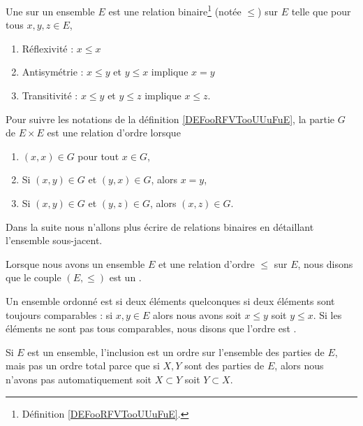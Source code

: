 \begin{definition}      \label{DefooFLYOooRaGYRk}
	Une  sur un ensemble \( E\) est une relation binaire\footnote{Définition \ref{DEFooRFVTooUUuFuE}.} (notée \( \leq\)) sur \( E\) telle que pour tous \( x,y,z\in E\),
	\begin{enumerate}
		\item
		      Réflexivité : \( x\leq x\)
		\item \label{ITEMooQTXOooTZXEnu}
		      Antisymétrie : \( x\leq y\) et \( y\leq x\) implique \( x=y\)
		\item
		      Transitivité : \( x\leq y\) et \( y\leq z\) implique \( x\leq z\).
	\end{enumerate}

	Pour suivre les notations de la définition \ref{DEFooRFVTooUUuFuE}, la partie \( G\) de \( E\times E\) est une relation d'ordre lorsque
	\begin{enumerate}
		\item
		      \( (x,x)\in G\) pour tout \( x\in G\),
		\item
		      Si \( (x,y)\in G\) et \( (y,x)\in G\), alors \( x=y\),
		\item
		      Si \( (x,y)\in G\) et \( (y,z)\in G\), alors \( (x,z)\in G\).
	\end{enumerate}
	Dans la suite nous n'allons plus écrire de relations binaires en détaillant l'ensemble sous-jacent.

	Lorsque nous avons un ensemble \( E\) et une relation d'ordre \( \leq\) sur \( E\), nous disons que le couple \( (E,\leq)\) est un .
\end{definition}

\begin{definition}      \label{DEFooVGYQooUhUZGr}
	Un ensemble ordonné est  si deux éléments quelconques si deux éléments sont toujours comparables : si \( x,y\in E\) alors nous avons soit \( x\leq y\) soit \( y\leq x\). Si les éléments ne sont pas tous comparables, nous disons que l'ordre est .
\end{definition}

\begin{example}  \label{ExeooOrdreInclusion}
	Si \( E\) est un ensemble, l'inclusion est un ordre sur l'ensemble des parties de \( E\), mais pas un ordre total parce que si \( X,Y\) sont des parties de \( E\), alors nous n'avons pas automatiquement soit \( X\subset Y\) soit \( Y\subset X\).
\end{example}

